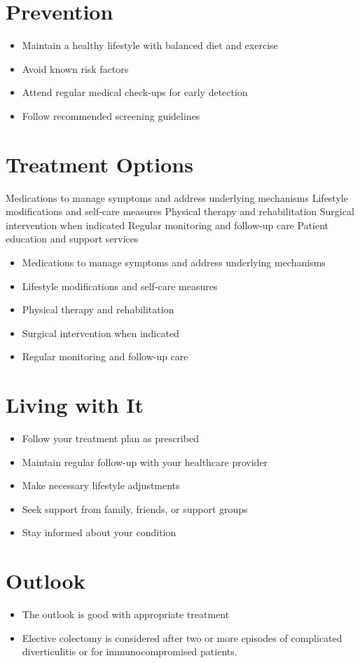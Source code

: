 \section{Prevention}
\begin{itemize}[noitemsep]
  \item Maintain a healthy lifestyle with balanced diet and exercise
  \item Avoid known risk factors
  \item Attend regular medical check-ups for early detection
  \item Follow recommended screening guidelines
\end{itemize}
\section{Treatment Options}
Medications to manage symptoms and address underlying mechanisms Lifestyle modifications and self-care measures Physical therapy and rehabilitation Surgical intervention when indicated Regular monitoring and follow-up care Patient education and support services

\begin{itemize}[noitemsep]
  \item Medications to manage symptoms and address underlying mechanisms
  \item Lifestyle modifications and self-care measures
  \item Physical therapy and rehabilitation
  \item Surgical intervention when indicated
  \item Regular monitoring and follow-up care
\end{itemize}
\section{Living with It}
\begin{itemize}[noitemsep]
  \item Follow your treatment plan as prescribed
  \item Maintain regular follow-up with your healthcare provider
  \item Make necessary lifestyle adjustments
  \item Seek support from family, friends, or support groups
  \item Stay informed about your condition
\end{itemize}
\section{Outlook}
\begin{itemize}[noitemsep]
  \item The outlook is good with appropriate treatment
  \item Elective colectomy is considered after two or more episodes of complicated diverticulitis or for immunocompromised patients.
\end{itemize}

